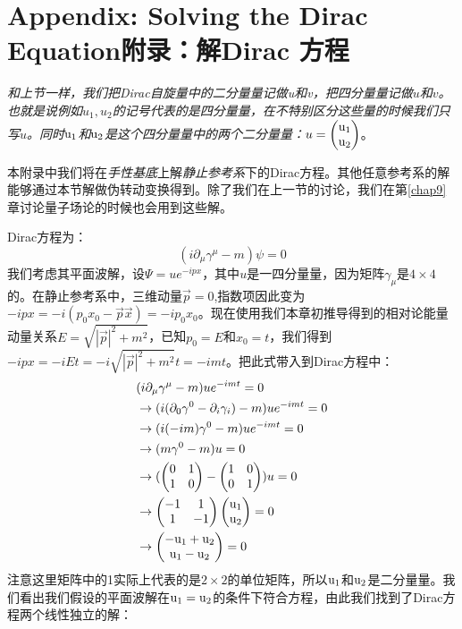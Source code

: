 \section[附录：解Dirac 方程]{Appendix: Solving the Dirac Equation\quad 附录：解Dirac 方程}\label{sec8.9}
{\itshape 和上节一样，我们把Dirac自旋量中的二分量量记做{\rm u}和{\rm v}，把四分量量记做$u$和$v$。也就是说例如$u_1,u_2$的记号代表的是四分量量，在不特别区分这些量的时候我们只写$u$。同时${\rm u_1}$和${\rm u_2}$是这个四分量量中的两个二分量量：$u=\begin{pmatrix} \rm u_1 \\ \rm u_2 \end{pmatrix} $}。
\par
本附录中我们将在{\itshape 手性基底}上解{\itshape 静止参考系}下的Dirac方程。其他任意参考系的解能够通过本节解做伪转动变换得到。除了我们在上一节的讨论，我们在第\ref{chap9}章讨论量子场论的时候也会用到这些解。\par
Dirac方程为：
\begin{equation}
(i\partial_\mu \gamma^\mu -m)\psi=0
\end{equation}
我们考虑其平面波解，设$\Psi=ue^{-ipx}$，其中$u$是一四分量量，因为矩阵$\gamma_\mu$是$4 \times 4$的。在静止参考系中，三维动量$\vec{p}=0$,指数项因此变为$-ipx=-i(p_0x_0-\vec{p}\vec{x})=-ip_0x_0$。现在使用我们本章初推导得到的相对论能量动量关系$E=\sqrt{|\vec{p}|^2+m^2}$，已知$p_0=E$和$x_0=t$，我们得到$-ipx=-iEt=-i\sqrt{|\vec{p}|^2+m^2}t=-imt$。把此式带入到Dirac方程中：
\begin{equation}
\begin{split}
&(i\partial_\mu\gamma^\mu-m)ue^{-imt}=0\\
&\to (i(\partial_0\gamma^0-\partial_i\gamma_i)-m)ue^{-imt}=0\\
&\to (i(-im)\gamma^0-m)ue^{-imt}=0\\
&\to (m\gamma^0-m)u=0\\
&\to (\begin{pmatrix} 0 & 1 \\ 1 & 0 \end{pmatrix} -\begin{pmatrix} 1 & 0 \\ 0 & 1 \end{pmatrix})u=0\\
&\to \begin{pmatrix} -1 & 1 \\ 1 & -1 \end{pmatrix} \begin{pmatrix} \rm u_1 \\ \rm u_2 \end{pmatrix} =0\\
&\to \begin{pmatrix} \rm -u_1+u_2 \\ \rm u_1-u_2 \end{pmatrix} =0
\end{split}
\end{equation}
注意这里矩阵中的1实际上代表的是$2 \times 2$的单位矩阵，所以$\rm u_1$和$\rm u_2$是二分量量。我们看出我们假设的平面波解在$\rm u_1 =u_2$的条件下符合方程，由此我们找到了Dirac方程两个线性独立的解：
